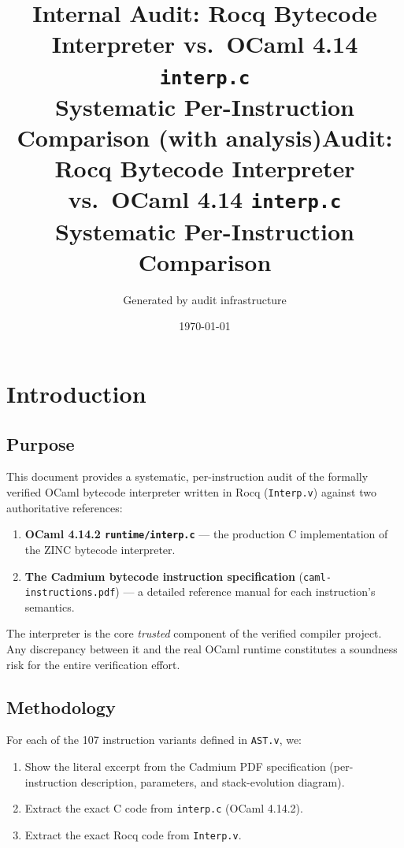 \documentclass[11pt,a4paper]{article}
\title{\textbf{Internal Audit: Rocq Bytecode Interpreter vs.\ OCaml 4.14 \texttt{interp.c}}\\[0.3em]
    \large Systematic Per-Instruction Comparison (with analysis)}
\title{\textbf{Audit: Rocq Bytecode Interpreter vs.\ OCaml 4.14 \texttt{interp.c}}\\[0.3em]
    \large Systematic Per-Instruction Comparison}
\author{Generated by audit infrastructure}
\date{\today}
\newif\ifinternalaudit
\newcommand{\statusok}{\textbf{\textcolor{green!50!black}{OK}}\xspace}
\begin{document}
\maketitle
\tableofcontents
\newpage

\section{Introduction}

\subsection{Purpose}

This document provides a systematic, per-instruction audit of the formally
verified OCaml bytecode interpreter written in Rocq (\texttt{Interp.v}) against
two authoritative references:

\begin{enumerate}
  \item \textbf{OCaml 4.14.2 \texttt{runtime/interp.c}} --- the production C
    implementation of the ZINC bytecode interpreter.
  \item \textbf{The Cadmium bytecode instruction specification}
    (\texttt{caml-instructions.pdf}) --- a detailed reference manual for
    each instruction's semantics.
\end{enumerate}

The interpreter is the core \emph{trusted} component of the verified compiler
project.  Any discrepancy between it and the real OCaml runtime constitutes a
soundness risk for the entire verification effort.

\subsection{Methodology}

For each of the 107 instruction variants defined in \texttt{AST.v}, we:

\begin{enumerate}
  \item Show the literal excerpt from the Cadmium PDF specification
    (per-instruction description, parameters, and stack-evolution diagram).
  \item Extract the exact C code from \texttt{interp.c} (OCaml 4.14.2).
  \item Extract the exact Rocq code from \texttt{Interp.v}.
\ifinternalaudit
  \item Compare the three, noting any discrepancies.
  \item Assign a \emph{status} (\statusok, bug, or needs-test) and a
    \emph{risk level} (low, medium, or high).
\fi
\end{enumerate}
\end{document}
